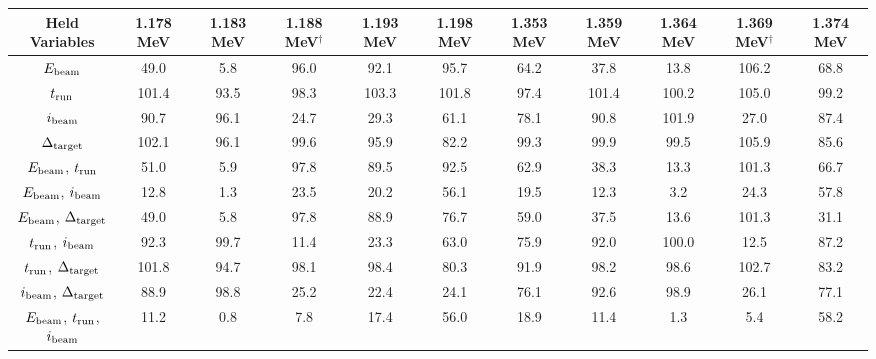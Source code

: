 \begin{landscape}
\begin{longtable}\small
    \begin{center}
        \caption{ACCEPTANCE BOUNDS WITH HELD VARIABLES, 67\,\%}
        \label{tab:acceptance-uncertainty-67}
        \begin{tabular}{cS[table-format=4.2]S[table-format=4.2]S[table-format=4.2]S[table-format=4.2]
        S[table-format=4.2]S[table-format=4.2]S[table-format=4.2]S[table-format=4.2]S[table-format=4.2]S[table-format=4.2]
        }
            \toprule
            \midrule
            \textbf{Held Variables} &
                \textbf{1.178 MeV} & \textbf{1.183 MeV} & \textbf{1.188 MeV}$^\dagger$ & \textbf{1.193 MeV} & \textbf{1.198 MeV} &
                \textbf{1.353 MeV} & \textbf{1.359 MeV} & \textbf{1.364 MeV} & \textbf{1.369 MeV}$^\dagger$ & \textbf{1.374 MeV} \\
            \midrule
$E_{\rm beam}$
    &  49.0 &   5.8 &  96.0 &  92.1 &  95.7 &  64.2 &  37.8 &  13.8 & 106.2 &  68.8 \\
$t_{\rm run}$
    & 101.4 &  93.5 &  98.3 & 103.3 & 101.8 &  97.4 & 101.4 & 100.2 & 105.0 &  99.2 \\
$i_{\rm beam}$
    &  90.7 &  96.1 &  24.7 &  29.3 &  61.1 &  78.1 &  90.8 & 101.9 &  27.0 &  87.4 \\
$\Delta_{\rm target}$
    & 102.1 &  96.1 &  99.6 &  95.9 &  82.2 &  99.3 &  99.9 &  99.5 & 105.9 &  85.6 \\
$E_{\rm beam}$, $t_{\rm run}$
    &  51.0 &   5.9 &  97.8 &  89.5 &  92.5 &  62.9 &  38.3 &  13.3 & 101.3 &  66.7 \\
$E_{\rm beam}$, $i_{\rm beam}$
    &  12.8 &   1.3 &  23.5 &  20.2 &  56.1 &  19.5 &  12.3 &   3.2 &  24.3 &  57.8 \\
$E_{\rm beam}$, $\Delta_{\rm target}$
    &  49.0 &   5.8 &  97.8 &  88.9 &  76.7 &  59.0 &  37.5 &  13.6 & 101.3 &  31.1 \\
$t_{\rm run}$, $i_{\rm beam}$
    &  92.3 &  99.7 &  11.4 &  23.3 &  63.0 &  75.9 &  92.0 & 100.0 &  12.5 &  87.2 \\
$t_{\rm run}$, $\Delta_{\rm target}$
    & 101.8 &  94.7 &  98.1 &  98.4 &  80.3 &  91.9 &  98.2 &  98.6 & 102.7 &  83.2 \\
$i_{\rm beam}$, $\Delta_{\rm target}$
    &  88.9 &  98.8 &  25.2 &  22.4 &  24.1 &  76.1 &  92.6 &  98.9 &  26.1 &  77.1 \\
$E_{\rm beam}$, $t_{\rm run}$, $i_{\rm beam}$
    &  11.2 &   0.8 &   7.8 &  17.4 &  56.0 &  18.9 &  11.4 &   1.3 &   5.4 &  58.2 \\

\end{tabular}
\end{center}
\end{longtable}
\end{landscape}
